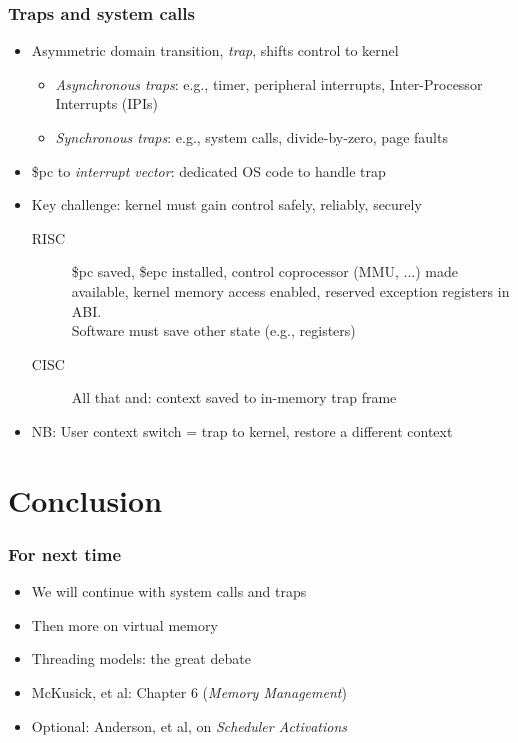\begin{frame}
  \frametitle{Traps and system calls}

  \begin{itemize}
    \pause

    \item Asymmetric domain transition, \textit{trap}, shifts control to kernel
    \begin{itemize}
      \item \textit{Asynchronous traps}: e.g., timer, peripheral interrupts,
	Inter-Processor Interrupts (IPIs)
      \item \textit{Synchronous traps}: e.g., system calls, divide-by-zero,
	page faults
    \end{itemize}

    \pause
    \medskip

    \item \$pc to \textit{interrupt vector}: dedicated OS code to handle trap
    \item Key challenge: kernel must gain control safely, reliably, securely
    \begin{description}
      \item[RISC] \$pc saved, \$epc installed, control coprocessor (MMU, ...)
        made available, kernel memory access enabled, reserved exception 
        registers in ABI. \\
        Software must save other state (e.g., registers)
      \item[CISC] All that and: context saved to in-memory trap frame
    \end{description}

    \medskip
    \pause

  \item NB: User context switch = trap to kernel, restore a different context
  \end{itemize}
\end{frame}

\section{Conclusion}

\begin{frame}
  \frametitle{For next time}

  \begin{itemize}
    \item We will continue with system calls and traps
    \item Then more on virtual memory
    \item Threading models: the great debate

    \bigskip

    \item McKusick, et al: Chapter 6 (\textit{Memory Management})
    \item Optional: Anderson, et al, on \textit{Scheduler Activations}
  \end{itemize}

\end{frame}


